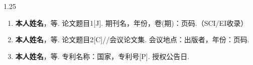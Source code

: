 \begin{publications}
\noindent
\renewcommand{\labelenumi}{[\arabic{enumi}]}
\begin{spacing}{1.25}

\begin{enumerate}
\item \textbf{本人姓名}，等. 论文题目1[J]. 期刊名，年份，卷(期)：页码.（SCI/EI收录）
\item \textbf{本人姓名}，等. 论文题目2[C]//会议论文集. 会议地点：出版者，年份：页码.
\item \textbf{本人姓名}，等. 专利名称：国家，专利号[P]. 授权公告日.
\end{enumerate}

\end{spacing}

\end{publications}
